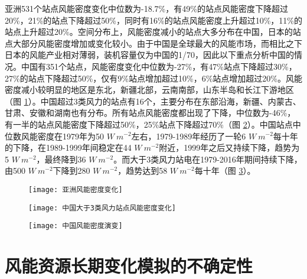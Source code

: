 亚洲531个站点风能密度变化中位数为-18.7\%，有49\%的站点风能密度下降超过20\%，21\%的站点下降超过50\%，同时有16\%的站点风能密度上升超过10\%，11\%的站点上升超过20\%。空间分布上，风能密度减小的站点大多分布在中国，日本的站点大部分风能密度增加或变化较小。由于中国是全球最大的风能市场，而相比之下日本的风能产业相对薄弱，装机容量仅为中国的1/70，因此以下重点分析中国的情况。中国有351个站点，风能密度变化中位数为-27\%，有47\%站点下降超过30\%，27\%的站点下降超过50\%，仅有9\%站点增加超过10\%，6\%站点增加超过20\%。风能密度减小较明显的地区是东北，新疆北部，云南南部，山东半岛和长江下游地区（图 \ref{fig:ASwindpowerchange}）。中国超过3类风力的站点有16个，主要分布在东部沿海，新疆、内蒙古、甘肃、安徽和湖南也有分布。所有站点风能密度都出现了下降，中位数为-46\%，有一半的站点风能密度下降超过50\%，25\%站点下降超过70\%（图 \ref{fig:CHNwindpowerchangeover3}）。中国站点中位数风能密度在1979年为50 $W ~ m^{-2}$左右，1979-1989年经历了一轮6 $W ~ m^{-2}$每十年的下降，在1989-1999年间稳定在44 $W ~ m^{-2}$附近，1999年之后又持续下降，趋势为5 $W ~ m^{-2}$，最终降到36 $W ~ m^{-2}$。而大于3类风力站电在1979-2016年期间持续下降，由500 $W ~ m^{-2}$下降到280 $W ~ m^{-2}$，趋势达到58 $W ~ m^{-2}$每十年（图 \ref{fig:CHNwindpowerevolution}）。

\begin{figure}[!htbp]
    \centering
     \texttt{[image: 亚洲风能密度变化]}
    \label{fig:ASwindpowerchange}
\end{figure}

\begin{figure}[!htbp]
    \centering
     \texttt{[image: 中国大于3类风力站点风能密度变化]}
    \label{fig:CHNwindpowerchangeover3}
\end{figure}

\begin{figure}[!htbp]
    \centering
     \texttt{[image: 中国风能密度演变]}
    \label{fig:CHNwindpowerevolution}
\end{figure}

\section{风能资源长期变化模拟的不确定性}

